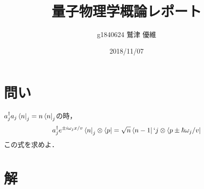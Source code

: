\documentclass[10pt]{ujarticle}
\title{量子物理学概論レポート}
\author{g1840624 鷲津 優維}
\date{2018/11/07}
\begin{document}
\maketitle
\section{問い}
$a^{\dagger}_j a_j \bra{n}_j = n\bra{n}_j$の時，
\[
a^{\dagger}_j e^{\pm i \omega_j x/v} \bra{n}_j \otimes \bra{p} = \sqrt{n} \bra{n-1}`j \otimes \bra{p \pm \hbar \omega_j /v}
\]
この式を求めよ．

\section{解}
\end{document}
